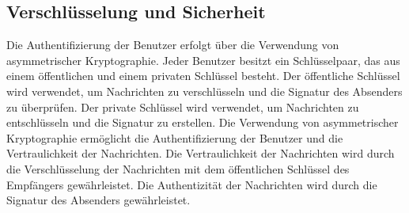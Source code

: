\subsection{Verschlüsselung und Sicherheit}
\label{subsec:verschluesselung_und_sicherheit}

Die Authentifizierung der Benutzer erfolgt über die Verwendung von asymmetrischer Kryptographie. Jeder Benutzer besitzt ein Schlüsselpaar, das aus einem öffentlichen und einem privaten Schlüssel besteht. Der öffentliche Schlüssel wird verwendet, um Nachrichten zu verschlüsseln und die Signatur des Absenders zu überprüfen. Der private Schlüssel wird verwendet, um Nachrichten zu entschlüsseln und die Signatur zu erstellen. Die Verwendung von asymmetrischer Kryptographie ermöglicht die Authentifizierung der Benutzer und die Vertraulichkeit der Nachrichten. Die Vertraulichkeit der Nachrichten wird durch die Verschlüsselung der Nachrichten mit dem öffentlichen Schlüssel des Empfängers gewährleistet. Die Authentizität der Nachrichten wird durch die Signatur des Absenders gewährleistet.